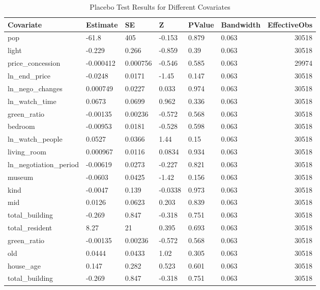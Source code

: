 \begin{table}[ht]
\centering
\caption{Placebo Test Results for Different Covariates} 
\label{tab:placebo_test_results}
\begin{tabular}{llllllr}
  \hline
Covariate & Estimate & SE & Z & PValue & Bandwidth & EffectiveObs \\ 
  \hline
pop & -61.8 & 405 & -0.153 & 0.879 & 0.063 & 30518 \\ 
  light & -0.229 & 0.266 & -0.859 & 0.39 & 0.063 & 30518 \\ 
  price\_concession & -0.000412 & 0.000756 & -0.546 & 0.585 & 0.063 & 29974 \\ 
  ln\_end\_price & -0.0248 & 0.0171 & -1.45 & 0.147 & 0.063 & 30518 \\ 
  ln\_nego\_changes & 0.000749 & 0.0227 & 0.033 & 0.974 & 0.063 & 30518 \\ 
  ln\_watch\_time & 0.0673 & 0.0699 & 0.962 & 0.336 & 0.063 & 30518 \\ 
  green\_ratio & -0.00135 & 0.00236 & -0.572 & 0.568 & 0.063 & 30518 \\ 
  bedroom & -0.00953 & 0.0181 & -0.528 & 0.598 & 0.063 & 30518 \\ 
  ln\_watch\_people & 0.0527 & 0.0366 & 1.44 & 0.15 & 0.063 & 30518 \\ 
  living\_room & 0.000967 & 0.0116 & 0.0834 & 0.934 & 0.063 & 30518 \\ 
  ln\_negotiation\_period & -0.00619 & 0.0273 & -0.227 & 0.821 & 0.063 & 30518 \\ 
  museum & -0.0603 & 0.0425 & -1.42 & 0.156 & 0.063 & 30518 \\ 
  kind & -0.0047 & 0.139 & -0.0338 & 0.973 & 0.063 & 30518 \\ 
  mid & 0.0126 & 0.0623 & 0.203 & 0.839 & 0.063 & 30518 \\ 
  total\_building & -0.269 & 0.847 & -0.318 & 0.751 & 0.063 & 30518 \\ 
  total\_resident & 8.27 & 21 & 0.395 & 0.693 & 0.063 & 30518 \\ 
  green\_ratio & -0.00135 & 0.00236 & -0.572 & 0.568 & 0.063 & 30518 \\ 
  old & 0.0444 & 0.0433 & 1.02 & 0.305 & 0.063 & 30518 \\ 
  house\_age & 0.147 & 0.282 & 0.523 & 0.601 & 0.063 & 30518 \\ 
  total\_building & -0.269 & 0.847 & -0.318 & 0.751 & 0.063 & 30518 \\ 
   \hline
\end{tabular}
\end{table}

